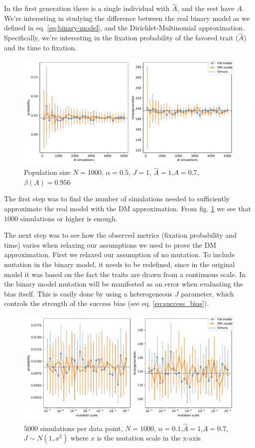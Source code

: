 \documentclass[11pt]{article}
\begin{document}
In the first generation there is a single individual with $\hat{A}$, and the rest have $A$.
We're interesting in studying the difference between the real binary model as we defined in eq. \ref{eq:binary-model}, and the Dirichlet-Multinomial approximation. Specifically, we're interesting in the fixation probability of the favored trait ($\hat{A}$) and its time to fixation.

\begin{figure}
    \includegraphics[width=\linewidth]{../figures/binary/num_sims.pdf}
  \caption{Population size $N=1000$, $\alpha=0.5$, $J=1$, $\hat{A}=1$,$A=0.7$, $\beta(A)=0.956$}	
  \label{fig:num_sims}
\end{figure}


The first step was to find the number of simulations needed to sufficiently approximate the real model with the DM approximation. From fig. \ref{fig:num_sims} we see that $1000$ simulations or higher is enough.

The next step was to see how the observed metrics (fixation probability and time) varies when relaxing our assumptions we used to prove the DM approximation.
First we relaxed our assumption of no mutation. To include mutation in the binary model, it needs to be redefined, since in the original model it was based on the fact the traits are drawn from a continuous scale. In the binary model mutation will be manifested as an error when evaluating the bias itself. This is easily done by using a heterogeneous $J$ parameter, which controls the strength of the success bias (see eq. \ref{eq:success_bias}).


\begin{figure}
    \includegraphics[width=\linewidth]{../figures/binary/full_vs_dm_mutation.pdf}
  \caption{$5000$ simulations per data point, $N=1000$, $\alpha=0.1$,$\hat{A}=1$,$A=0.7$, $J\sim N(1,x^2)$ where $x$ is the mutation scale in the x-axis}	
  \label{fig:hetro_mutation}
\end{figure}
\end{document}
